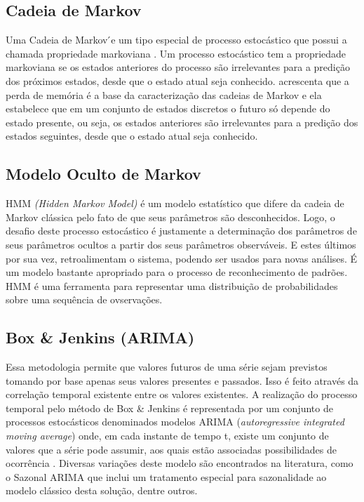 \documentclass[twoside,english,brazilian]{UNISINOSmonografia}
\begin{document}
\subsection{Cadeia de Markov}
Uma Cadeia de Markov ́e um tipo especial de processo estocástico que possui a chamada propriedade markoviana . Um processo estocástico tem a propriedade markoviana se os estados anteriores do processo são irrelevantes para a predição dos próximos estados, desde que o estado atual seja conhecido. 
\citep{Junior2011} acrescenta que a perda de memória é a base da caracterização das cadeias de Markov e ela estabelece que em um conjunto de estados discretos o futuro só depende do estado presente, ou seja, os estados anteriores são irrelevantes para a predição dos estados seguintes, desde que o estado atual seja conhecido.

\subsection{Modelo Oculto de Markov}
HMM \textit{(Hidden Markov Model)} é um modelo estatístico que difere da cadeia de Markov clássica pelo fato de que seus parâmetros são desconhecidos. Logo, o desafio deste processo estocástico é justamente a determinação dos parâmetros de seus parâmetros ocultos a partir dos seus parâmetros observáveis. E estes últimos por sua vez, retroalimentam o sistema, podendo ser usados para novas análises. É um modelo bastante apropriado para o processo de reconhecimento de padrões. HMM é uma ferramenta para representar uma distribuição de probabilidades sobre uma sequência de ovservações.

\subsection{Box & Jenkins (ARIMA)}
Essa metodologia permite que valores futuros de uma série sejam previstos tomando por base apenas seus valores presentes e passados. Isso é feito através da correlação temporal existente entre os valores existentes. A realização do processo temporal pelo método de Box & Jenkins é representada por um conjunto de processos estocásticos denominados modelos ARIMA (\textit{autoregressive integrated moving average}) onde, em cada instante de tempo t, existe um conjunto de valores que a série pode assumir, aos quais estão associadas possibilidades de ocorrência \citep{Silva2005}. 
Diversas variações deste modelo são encontrados na literatura, como o Sazonal ARIMA que inclui um tratamento especial para sazonalidade ao modelo clássico desta solução, dentre outros.
\end{document}
